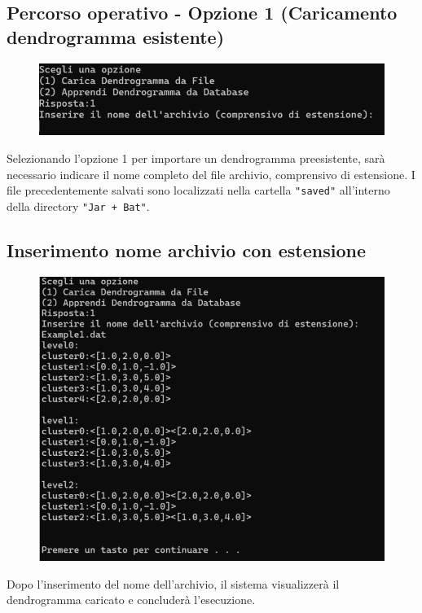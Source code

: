 \subsection{Percorso operativo - Opzione 1 (Caricamento dendrogramma esistente)}
\begin{figure}[h!]
    \centering
    \includegraphics[width=\textwidth]{images/carica_dendrogramma_file.png}
\end{figure}

Selezionando l'opzione 1 per importare un dendrogramma preesistente, sarà necessario indicare il nome completo del file archivio, comprensivo di estensione. I file precedentemente salvati sono localizzati nella cartella \texttt{"saved"} all'interno della directory \texttt{"Jar + Bat"}.

\subsection{Inserimento nome archivio con estensione}

\begin{figure}[h!]
    \centering
    \includegraphics[width=\textwidth]{images/inserimento_nome_archivio.png}
\end{figure}

Dopo l'inserimento del nome dell'archivio, il sistema visualizzerà il dendrogramma caricato e concluderà l'esecuzione.
